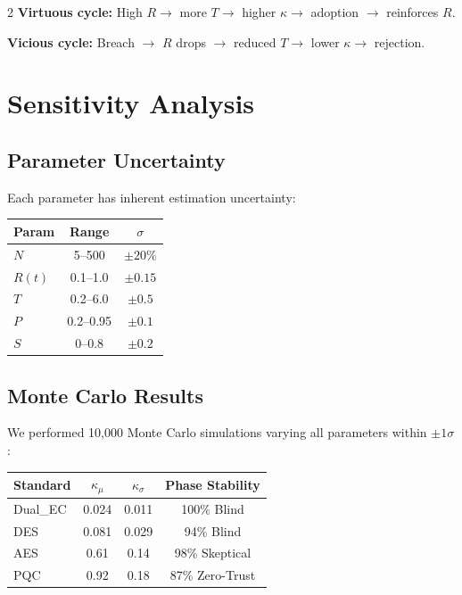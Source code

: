 \documentclass[11pt]{article}
\begin{document}
\begin{multicols}{2}
\textbf{Virtuous cycle:} High $R \to$ more $T \to$ higher $\kappa \to$ adoption $\to$ reinforces $R$.

\textbf{Vicious cycle:} Breach $\to$ $R$ drops $\to$ reduced $T \to$ lower $\kappa \to$ rejection.

\section{Sensitivity Analysis}

\subsection{Parameter Uncertainty}

Each parameter has inherent estimation uncertainty:

\begin{center}
\small
\begin{tabular}{@{}lcc@{}}
\toprule
\textbf{Param} & \textbf{Range} & \textbf{$\sigma$} \\
\midrule
$N$ & 5--500 & $\pm 20\%$ \\
$R(t)$ & 0.1--1.0 & $\pm 0.15$ \\
$T$ & 0.2--6.0 & $\pm 0.5$ \\
$P$ & 0.2--0.95 & $\pm 0.1$ \\
$S$ & 0--0.8 & $\pm 0.2$ \\
\bottomrule
\end{tabular}
\end{center}

\subsection{Monte Carlo Results}

We performed 10,000 Monte Carlo simulations varying all parameters within $\pm 1\sigma$:

\begin{center}
\small
\begin{tabular}{@{}lccc@{}}
\toprule
\textbf{Standard} & $\kappa_{\mu}$ & $\kappa_{\sigma}$ & \textbf{Phase Stability} \\
\midrule
Dual\_EC & 0.024 & 0.011 & 100\% Blind \\
DES & 0.081 & 0.029 & 94\% Blind \\
AES & 0.61 & 0.14 & 98\% Skeptical \\
PQC & 0.92 & 0.18 & 87\% Zero-Trust \\
\bottomrule
\end{tabular}
\end{center}


\end{multicols}
\end{document}
